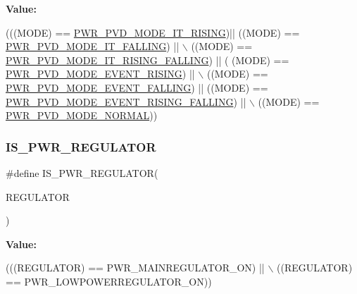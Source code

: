 {\bfseries Value\+:}
\begin{DoxyCode}
(((MODE) == \mbox{\hyperlink{group___p_w_r___p_v_d___mode_ga102d7b8354419990a2a780f61cd020a6}{PWR\_PVD\_MODE\_IT\_RISING}})|| ((MODE) == 
      \mbox{\hyperlink{group___p_w_r___p_v_d___mode_gab600a54f3a588de836cfe4b727ab8a53}{PWR\_PVD\_MODE\_IT\_FALLING}}) || \(\backslash\)
                              ((MODE) == \mbox{\hyperlink{group___p_w_r___p_v_d___mode_gac531fbf14457e6595505354fad521b67}{PWR\_PVD\_MODE\_IT\_RISING\_FALLING}}) || (
      (MODE) == \mbox{\hyperlink{group___p_w_r___p_v_d___mode_ga1a946b01887aa886de329a92c3ab0dd4}{PWR\_PVD\_MODE\_EVENT\_RISING}}) || \(\backslash\)
                              ((MODE) == \mbox{\hyperlink{group___p_w_r___p_v_d___mode_gaaedbe45f1a1ea6c30af6ac51abae0cae}{PWR\_PVD\_MODE\_EVENT\_FALLING}}) || ((MODE) 
      == \mbox{\hyperlink{group___p_w_r___p_v_d___mode_ga7455387c8e9049f9f66b46423d4f4091}{PWR\_PVD\_MODE\_EVENT\_RISING\_FALLING}}) || \(\backslash\)
                              ((MODE) == \mbox{\hyperlink{group___p_w_r___p_v_d___mode_ga3a4bf701a36a14a4edf4dc5a28153277}{PWR\_PVD\_MODE\_NORMAL}}))
\end{DoxyCode}
\mbox{\label{group___p_w_r___i_s___p_w_r___definitions_ga03c105070272141c0bab5f2b74469072}} 
\subsubsection{\texorpdfstring{I\+S\+\_\+\+P\+W\+R\+\_\+\+R\+E\+G\+U\+L\+A\+T\+OR}{IS\_PWR\_REGULATOR}}
{\footnotesize\ttfamily \#define I\+S\+\_\+\+P\+W\+R\+\_\+\+R\+E\+G\+U\+L\+A\+T\+OR(\begin{DoxyParamCaption}\item[{}]{R\+E\+G\+U\+L\+A\+T\+OR }\end{DoxyParamCaption})}

{\bfseries Value\+:}
\begin{DoxyCode}
(((REGULATOR) == PWR\_MAINREGULATOR\_ON) || \(\backslash\)
                                     ((REGULATOR) == PWR\_LOWPOWERREGULATOR\_ON))
\end{DoxyCode}
